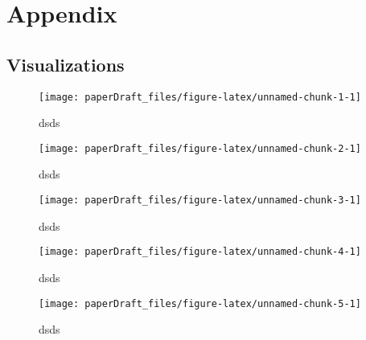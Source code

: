 \documentclass[
  12pt,
  dvipsnames,enabledeprecatedfontcommands]{scrartcl}
\begin{document}
\hypertarget{appendix}{%
\section{Appendix}\label{appendix}}

\hypertarget{visualizations}{%
\subsection{Visualizations}\label{visualizations}}

\label{appendix:visualizations}

\begin{figure}[H]


\begin{center}\texttt{[image: paperDraft\_files/figure-latex/unnamed-chunk-1-1]} \end{center}
\caption{dsds}
\label{fig:weat7google}
\end{figure}

\begin{figure}[H]


\begin{center}\texttt{[image: paperDraft\_files/figure-latex/unnamed-chunk-2-1]} \end{center}
\caption{dsds}
\label{fig:weat7glove}
\end{figure}

\begin{figure}[H]


\begin{center}\texttt{[image: paperDraft\_files/figure-latex/unnamed-chunk-3-1]} \end{center}
\caption{dsds}
\label{fig:weat7reddit}
\end{figure}

\begin{figure}[H]


\begin{center}\texttt{[image: paperDraft\_files/figure-latex/unnamed-chunk-4-1]} \end{center}
\caption{dsds}
\label{fig:weat1google}
\end{figure}

\begin{figure}[H]


\begin{center}\texttt{[image: paperDraft\_files/figure-latex/unnamed-chunk-5-1]} \end{center}
\caption{dsds}
\label{fig:weat1glove}
\end{figure}
\end{document}

